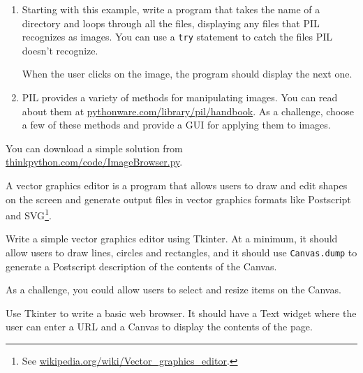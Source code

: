 \documentclass[10pt]{book}
\begin{document}
{\begin{ex}
\begin{enumerate}
This behavior can be frustrating, which is why I am warning
you (and why the example image says ``Danger!'').


\item Starting with this example, write a program that takes
the name of a directory and loops through all the files, displaying
any files that PIL recognizes as images.  You can use a {\tt try}
statement to catch the files PIL doesn't recognize.

When the user clicks on the image, the program should display the next one.

\item PIL provides a variety of methods for manipulating images.
You can read about them at \url{pythonware.com/library/pil/handbook}.
As a challenge, choose a few of these methods and provide a
GUI for applying them to images.

\end{enumerate}

You can download a simple solution from
\url{thinkpython.com/code/ImageBrowser.py}.

\end{ex}


\begin{ex}


A vector graphics editor is a program that allows users to draw and
edit shapes on the screen and generate output files in vector graphics
formats like Postscript and SVG\footnote{See
  \url{wikipedia.org/wiki/Vector_graphics_editor}.}.

Write a simple vector graphics editor using Tkinter.  At a
minimum, it should allow users to draw lines, circles and
rectangles, and it should use {\tt Canvas.dump} to
generate a Postscript description of the contents of the
Canvas.

As a challenge, you could allow users to select and resize
items on the Canvas.

\end{ex}


\begin{ex}

Use Tkinter to write a basic web browser.  It
should have a Text widget where the user can enter a URL
and a Canvas to display the contents of the page.



\end{ex}}
\end{document}
